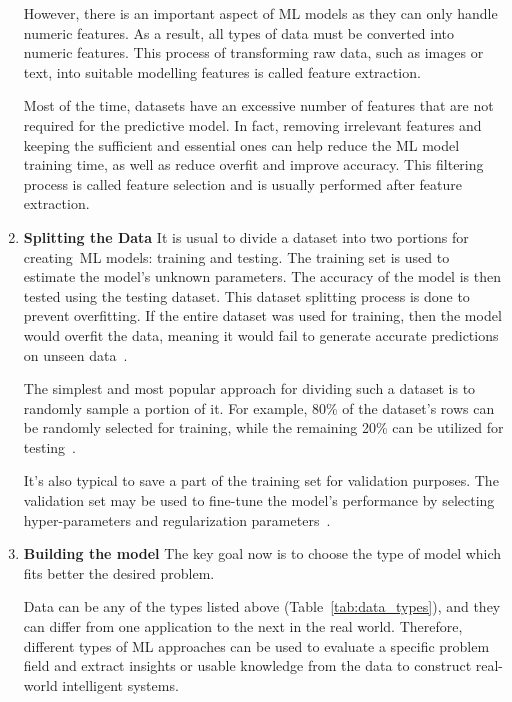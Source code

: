 \begin{enumerate}
    However, there is an important aspect of \gls{ML} models as they can only handle numeric features. As a result, all types of data must be converted into numeric features. This process of transforming raw data, such as images or text, into suitable modelling features is called feature extraction.
    
    Most of the time, datasets have an excessive number of features that are not required for the predictive model. In fact, removing irrelevant features and keeping the sufficient and essential ones can help reduce the \gls{ML} model training time, as well as reduce overfit and improve accuracy. This filtering process is called feature selection and is usually performed after feature extraction.
    
    \item \textbf{Splitting the Data} It is usual to divide a dataset into two portions for creating \gls{ML} models: training and testing. The training set is used to estimate the model's unknown parameters. The accuracy of the model is then tested using the testing dataset. This dataset splitting process is done to prevent overfitting. If the entire dataset was used for training, then the model would overfit the data, meaning it would fail to generate accurate predictions on unseen data~\cite{Joseph2020SPlit:Splitting}.
    
    The simplest and most popular approach for dividing such a dataset is to randomly sample a portion of it. For example, 80\% of the dataset's rows can be randomly selected for training, while the remaining 20\% can be utilized for testing~\cite{Joseph2020SPlit:Splitting}.
    
    It's also typical to save a part of the training set for validation purposes. The validation set may be used to fine-tune the model's performance by selecting hyper-parameters and regularization parameters~\cite{Joseph2020SPlit:Splitting}.
    
    \item \textbf{Building the model} The key goal now is to choose the type of model which fits better the desired problem.
    
    Data can be any of the types listed above (Table~\ref{tab:data_types}), and they can differ from one application to the next in the real world. Therefore, different types of \gls{ML} approaches can be used to evaluate a specific problem field and extract insights or usable knowledge from the data to construct real-world intelligent systems.
    

\end{enumerate}

